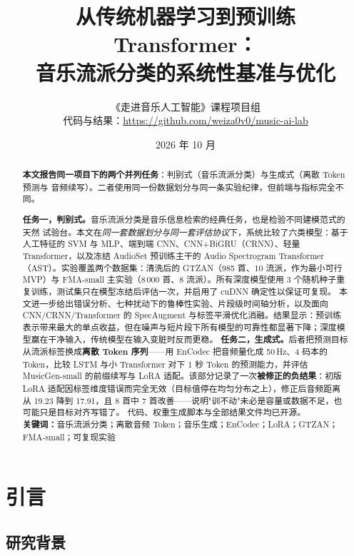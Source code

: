 \documentclass[UTF8,10pt,a4paper]{ctexart}
\title{\vspace{-1.2cm}\textbf{从传统机器学习到预训练 Transformer：\\音乐流派分类的系统性基准与优化}}
\author{《走进音乐人工智能》课程项目组\\
\small 代码与结果：\url{https://github.com/weiza0v0/music-ai-lab}}
\date{2026 年 10 月}
\begin{document}
\maketitle

\begin{abstract}
\noindent
\textbf{本文报告同一项目下的两个并列任务}：判别式（音乐流派分类）与生成式（离散 Token 预测与
音频续写）。二者使用同一份数据划分与同一条实验纪律，但前端与指标完全不同。

\textbf{任务一，判别式。}音乐流派分类是音乐信息检索的经典任务，也是检验不同建模范式的天然
试验台。本文在\emph{同一套数据划分与同一套评估协议}下，系统比较了六类模型：基于人工特征的 SVM 与 MLP、端到端 CNN、CNN+BiGRU（CRNN）、轻量 Transformer，以及冻结 AudioSet 预训练主干的 Audio Spectrogram Transformer（AST）。实验覆盖两个数据集：清洗后的 GTZAN（985 首、10 流派，作为最小可行 MVP）与 FMA-small 主实验（8\,000 首、8 流派）。所有深度模型使用 3 个随机种子重复训练，测试集只在模型冻结后评估一次，并启用了 cuDNN 确定性以保证可复现。
本文进一步给出错误分析、七种扰动下的鲁棒性实验、片段级时间轴分析，以及面向 CNN/CRNN/Transformer 的 SpecAugment 与标签平滑优化消融。结果显示：预训练表示带来最大的单点收益，但在噪声与短片段下所有模型的可靠性都显著下降；深度模型赢在干净输入，传统模型在输入变脏时反而更稳。
\textbf{任务二，生成式。}后者把预测目标从流派标签换成\textbf{离散 Token 序列}——用 EnCodec 把音频量化成 50\,Hz、4 码本的 Token，比较 LSTM 与小 Transformer 对下 1 秒 Token 的预测能力，并评估 MusicGen-small 的前缀续写与 LoRA 适配。该部分记录了一次\textbf{被修正的负结果}：初版 LoRA 适配因标签维度错误而完全无效（目标值停在均匀分布之上），修正后音频距离从 19.23 降到 17.91，且 8 首中 7 首改善——说明"训不动"未必是容量或数据不足，也可能只是目标对齐写错了。
代码、权重生成脚本与全部结果文件均已开源。
\vspace{0.3em}\\
\textbf{关键词：}音乐流派分类；离散音频 Token；音乐生成；EnCodec；LoRA；GTZAN；FMA-small；可复现实验
\end{abstract}

\newpage
\tableofcontents
\newpage

\section{引言}

\subsection{研究背景}
\end{document}
